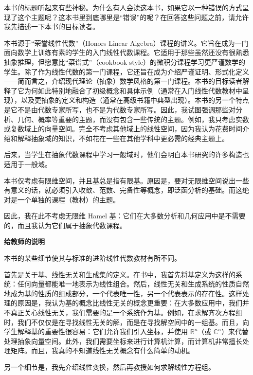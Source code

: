 

\begin{preface}

本书的标题听起来有些神秘。为什么有人会读这本书，如果它以一种错误的方式呈现了这个主题呢？这本书里到底哪里是“错误”的呢？在回答这些问题之前，请允许我先描述一下本书的目标读者。

本书源于“荣誉线性代数”（Honors Linear Algebra）课程的讲义。它旨在成为一门面向数学上训练有素的学生的入门线性代数课程。它适用于那些虽然还没有很熟悉抽象推理，但愿意比“菜谱式”（cookbook style）的微积分课程学习更严谨数学的学生。除了作为线性代数的第一门课程，它还旨在成为介绍严谨证明、形式化定义——简而言之，介绍现代理论（抽象）数学风格的第一门课程。本书的目标读者解释了它为何如此特别地融合了初级概念和具体示例（通常在入门线性代数教材中呈现），以及更抽象的定义和构造（通常在高级书籍中典型出现）。本书的另一个特点是它不是由代数专家所写，也不是为代数专家所写。因此，我试图强调那些对分析、几何、概率等重要的主题，而没有包含一些传统的主题。例如，我只考虑实数或复数域上的向量空间。完全不考虑其他域上的线性空间，因为我认为花费时间介绍和解释抽象域的知识，不如花在一些在其他学科中更必需的经典主题上。

后来，当学生在抽象代数课程中学习一般域时，他们会明白本书研究的许多构造也适用于一般域。

本书仅考虑有限维空间，并且基总是指有限基。原因是，要对无限维空间说出一些有意义的话，就必须引入收敛、范数、完备性等概念，即泛函分析的基础。而这绝对是一个单独的课程（教材）的主题。

因此，我在此不考虑无限维 Hamel 基：它们在大多数分析和几何应用中是不需要的，而且我认为它们属于抽象代数课程。

\textbf{给教师的说明}

本书的某些细节使其与标准的进阶线性代数教材有所不同。

首先是关于基、线性无关和生成集的定义。在书中，我首先将基定义为这样的系统：任何向量都能唯一地表示为线性组合。然后，线性无关和生成系统的性质自然地成为基的性质的组成部分，一个代表唯一性，另一个代表表示的存在性。这样处理的原因是，我认为基的概念比线性无关的概念更重要：在大多数应用中，我们并不真正关心线性无关，我们需要的是一个系统作为基。例如，在求解齐次方程组时，我们不仅仅是在寻找线性无关的解，而是在寻找解空间中的一组基。而且，向学生解释基的重要性很容易：它们允许我们引入坐标，并使用 $\mathbb{R}^n$（或 $\mathbb{C}^n$）来代替处理抽象向量空间。此外，我们需要坐标来进行计算机计算，而计算机非常擅长处理矩阵。而且，我真的不知道线性无关概念有什么简单的动机。

另一个细节是，我先介绍线性变换，然后再教授如何求解线性方程组。


\end{preface}
